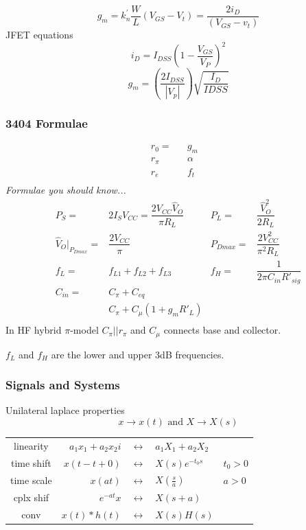 \documentclass[a4paper,12pt]{article}
\begin{document}
\begin{multicols}{2}
\[g_m = k_n^\prime \frac{W}{L} (V_{GS} - V_t) = \frac{2i_D}{(V_{GS} - v_t)}\]
JFET equations
\[i_D = I_{DSS} \left(1 - \frac{V_{GS}}{V_P}\right)^2\]
\[g_m = \left(\frac{2I_{DSS}}{|V_p|}\right)\sqrt{\frac{I_D}{I{DSS}}}\]


\subsubsection*{3404 Formulae}
\[ \begin{array}{cccc}
r_0=  &     &g_m    &\\
r_\pi &     &\alpha &\\
r_e   &     &f_t    &\\
\end{array} \]
\emph{Formulae you should know...}
\[ \begin{array}{rlrl}
P_S=&2I_SV_{CC}=\dfrac{2V_{CC}\hat{V}_O}{\pi R_L}&
P_L=&\dfrac{\hat{V}^2_O}{2 R_L}\\
\hat{V}_O|_{P_{Dmax}}=&\dfrac{2 V_{CC}}{\pi}
&P_{Dmax}=&\dfrac{2V^2_{CC}}{\pi^2R_L}\\
f_L=&f_{L1}+f_{L2}+f_{L3}&f_H=&\dfrac{1}{2\pi C_{in}R'_{sig}}\\
C_{in}= &C_\pi+C_{eq}&&\\
        &C_\pi+C_\mu(1+g_mR'_L)&&\\
\end{array}\]
In HF hybrid $\pi$-model $C_\pi||r_\pi$ and $C_\mu$ connects base and collector.

$f_L$ and $f_H$ are the lower and upper 3dB frequencies.
\columnbreak
\subsubsection*{Signals and Systems}
Unilateral laplace properties \[x \rightarrow x(t) \mbox{ and } X \rightarrow X(s)\]

\begin{tabular}{crcll}
linearity& $a_1x_1 + a_2x_2i$&$\leftrightarrow $&$a_1X_1+a_2X_2$&\\
time shift& $x(t-t+0) $&$\leftrightarrow $&$X(s)e^{-t_0s}$ & $t_0 > 0$\\
time scale&$x(at)$&$ \leftrightarrow $&$X\left( \frac{s}{a} \right)$ & $a>0$\\
cplx shif& $e^{-at}x $&$\leftrightarrow $&$X(s+a)$&\\
conv& $x(t)*h(t) $&$\leftrightarrow $&$X(s)H(s)$&\\
\end{tabular}


\end{multicols}
\end{document}
